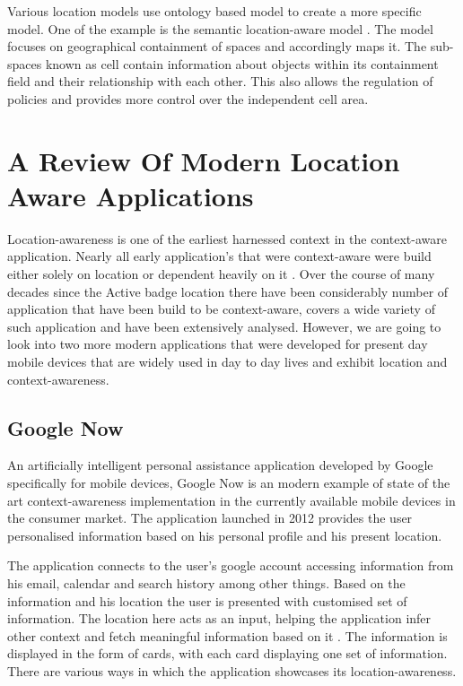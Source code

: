 \documentclass[12pt]{report}
\begin{document}
Various location models use ontology based model to create a more specific model. One of the example is the semantic location-aware model \cite{li2008semantic}. The model focuses on geographical containment of spaces and accordingly maps it. The sub-spaces known as cell contain information about objects within its containment field and their relationship with each other. This also allows the regulation of policies and provides more control over the independent cell area.


\chapter{A Review Of Modern Location Aware Applications}

Location-awareness is one of the earliest harnessed context in the context-aware application. Nearly all early application's that were context-aware were build either solely on location or dependent heavily on it \cite{baldauf2007survey}. Over the course of many decades since the Active badge location \cite{want1992active} there have been considerably number of application that have been build to be context-aware, \cite{chen2000survey} covers a wide variety of such application and have been extensively analysed. However, we are going to look into two more modern applications that were developed for present day mobile devices that are widely used in day to day lives and exhibit location and context-awareness. 

\section{Google Now}
An artificially intelligent personal assistance application developed by Google specifically for mobile devices, Google Now \cite{google2014app} is an modern example of state of the art context-awareness implementation in the currently available mobile devices in the consumer market. The application launched in 2012 provides the user personalised information based on his personal profile and his present location.

The application connects to the user's google account accessing information from his email, calendar and search history among other things. Based on the information and his location the user is presented with customised set of information. The location here acts as an input, helping the application infer other context and fetch meaningful information based on it \cite{koubek2013augmented}. The information is displayed in the form of cards, with each card displaying one set of information. There are various ways in which the application showcases its location-awareness.
\end{document}
